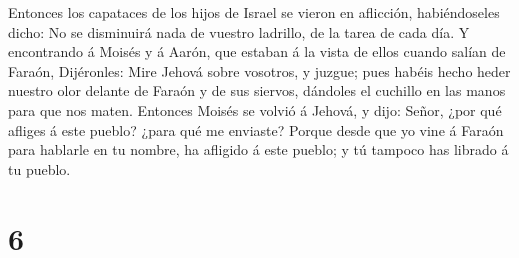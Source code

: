 Entonces los capataces de los hijos de Israel se vieron en aflicción,
habiéndoseles dicho: No se disminuirá nada de vuestro ladrillo, de la
tarea de cada día.  Y encontrando á Moisés y á Aarón, que
estaban á la vista de ellos cuando salían de Faraón, 
Dijéronles: Mire Jehová sobre vosotros, y juzgue; pues habéis hecho
heder nuestro olor delante de Faraón y de sus siervos, dándoles el
cuchillo en las manos para que nos maten.  Entonces
Moisés se volvió á Jehová, y dijo: Señor, ¿por qué afliges á este
pueblo? ¿para qué me enviaste?  Porque desde que yo vine
á Faraón para hablarle en tu nombre, ha afligido á este pueblo; y tú
tampoco has librado á tu pueblo.

\hypertarget{section-5}{%
\section{6}\label{section-5}}


